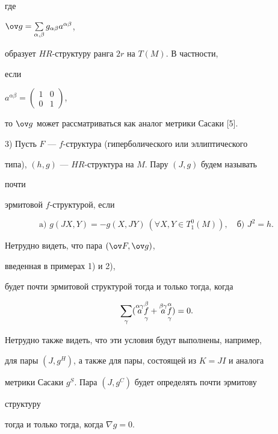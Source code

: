 где


$\ov g=\sum\limits_{\alpha,\beta}g_{\alpha\beta}a^{\alpha\beta}$,


образует $HR$-структуру ранга $2r$ на $T(M)$. В частности,


если


$a^{\alpha\beta}=\left(


\begin{smallmatrix} 1 & 0 \\ 0 & 1 \end{smallmatrix}\right)$,


то $\ov g$ может рассматриваться как аналог метрики Сасаки [5].


\medskip





3) Пусть $F$ --- $f$-структура (гиперболического или эллиптического


типа), $(h,g)$ --- $HR$-структура на $M$. Пару $(J,g)$ будем называть


почти


эрмитовой $f$-структурой, если


$$


\text{a) } g(JX,Y)=-g(X,JY) \ (\forall X,Y\in T^0_1(M)),\quad


\text{б) } J^2=h.


$$


Нетрудно видеть, что пара $(\ov F,\ov g)$,


введенная в примерах 1) и 2),


будет почти эрмитовой структурой тогда и только тогда, когда


$$


\sum_\gamma(\updown{\alpha\gamma}{}{a}


\updown{\beta}{\gamma}{f}+


\updown{\beta\gamma}{}{a}


\updown{\alpha}{\gamma}{f})=0.


$$


Нетрудно также видеть, что эти условия будут выполнены, например,


для пары $(J,g^H)$, а также для пары, состоящей из $K=JI$ и аналога


метрики Сасаки $g^S$. Пара $(J,g^C)$ будет определять почти эрмитову


структуру


тогда и только тогда, когда $\nabla g=0$.





